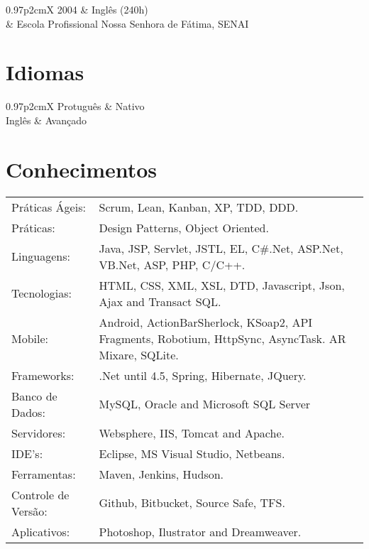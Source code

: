 \documentclass[a4paper, oneside, final]{article}
\begin{document}
\begin{center}
\begin{tabularx}{0.97\linewidth}{p{2cm}X}
2004       & Inglês (240h)\\
           & Escola Profissional Nossa Senhora de Fátima, SENAI
\end{tabularx}

%

\section{Idiomas}

\begin{tabularx}{0.97\linewidth}{p{2cm}X}
Protuguês      & Nativo\\
Inglês      & Avançado\\
\end{tabularx}

\section{Conhecimentos}

\begin{tabularx}{0.97\linewidth}{p{3.0cm}X}
Práticas Ágeis: 	& Scrum, Lean, Kanban, XP, TDD, DDD.\\
Práticas:  			& Design Patterns, Object Oriented.\\
Linguagens:       	& Java, JSP, Servlet, JSTL, EL, C\#.Net, ASP.Net, VB.Net, ASP, PHP, C/C++.\\
Tecnologias:    	& HTML, CSS, XML, XSL, DTD, Javascript, Json, Ajax and Transact SQL.\\
Mobile:          	& Android, ActionBarSherlock, KSoap2, API Fragments, Robotium, HttpSync, AsyncTask. AR Mixare, SQLite.\\
Frameworks:      	& .Net until 4.5, Spring, Hibernate, JQuery.\\
Banco de Dados:     & MySQL, Oracle and Microsoft SQL Server \\
Servidores:         & Websphere, IIS, Tomcat and Apache.\\
IDE's:            	& Eclipse, MS Visual Studio, Netbeans.\\
Ferramentas: 		& Maven, Jenkins, Hudson.\\
Controle de Versão: & Github, Bitbucket, Source Safe, TFS.\\
Aplicativos:    	& Photoshop, Ilustrator and Dreamweaver.\\
\end{tabularx}


\end{center}
\end{document}
